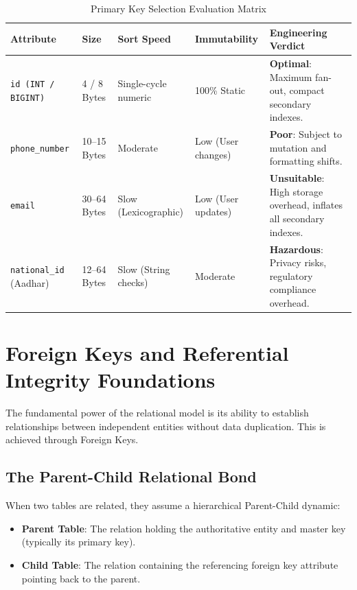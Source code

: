 \documentclass[10pt,journal,compsoc,onecolumn]{IEEEtran}
\begin{document}
\begin{table}[htbp]
\caption{Primary Key Selection Evaluation Matrix}
\label{tab:pk_evaluation}
\centering
\begin{tabular}{p{2.5cm}p{1.5cm}p{2.2cm}p{2.2cm}p{4.2cm}}
\toprule
\textbf{Attribute} & \textbf{Size} & \textbf{Sort Speed} & \textbf{Immutability} & \textbf{Engineering Verdict} \\
\midrule
\texttt{id (INT / BIGINT)} & 4 / 8 Bytes & Single-cycle numeric & 100\% Static & \textbf{Optimal}: Maximum fan-out, compact secondary indexes. \\
\midrule
\texttt{phone\_number} & 10--15 Bytes & Moderate & Low (User changes) & \textbf{Poor}: Subject to mutation and formatting shifts. \\
\midrule
\texttt{email} & 30--64 Bytes & Slow (Lexicographic) & Low (User updates) & \textbf{Unsuitable}: High storage overhead, inflates all secondary indexes. \\
\midrule
\texttt{national\_id} (Aadhar) & 12--64 Bytes & Slow (String checks) & Moderate & \textbf{Hazardous}: Privacy risks, regulatory compliance overhead. \\
\bottomrule
\end{tabular}
\end{table}

\section{Foreign Keys and Referential Integrity Foundations}
\label{sec:referential_integrity}

The fundamental power of the relational model is its ability to establish relationships between independent entities without data duplication. This is achieved through Foreign Keys.

\subsection{The Parent-Child Relational Bond}
When two tables are related, they assume a hierarchical Parent-Child dynamic:
\begin{itemize}
    \item \textbf{Parent Table}: The relation holding the authoritative entity and master key (typically its primary key).
    \item \textbf{Child Table}: The relation containing the referencing foreign key attribute pointing back to the parent.
\end{itemize}
\end{document}
